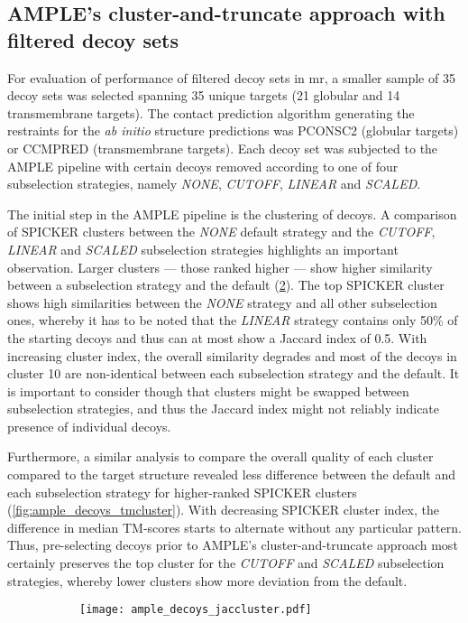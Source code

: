 \subsection{AMPLE's cluster-and-truncate approach with filtered decoy sets}
For evaluation of performance of filtered decoy sets in \gls{mr}, a smaller sample of 35 decoy sets was selected spanning 35 unique targets (21 globular and 14 transmembrane targets). The contact prediction algorithm generating the restraints for the \textit{ab initio} structure predictions was PCONSC2 (globular targets) or CCMPRED (transmembrane targets). Each decoy set was subjected to the AMPLE pipeline with certain decoys removed according to one of four subselection strategies, namely \textit{NONE}, \textit{CUTOFF}, \textit{LINEAR} and \textit{SCALED}.

The initial step in the AMPLE pipeline is the clustering of decoys. A comparison of SPICKER clusters between the \textit{NONE} default strategy and the \textit{CUTOFF}, \textit{LINEAR} and \textit{SCALED} subselection strategies highlights an important observation. Larger clusters --- those ranked higher --- show higher similarity between a subselection strategy and the default (\cref{fig:ample_decoys_jaccluster}). The top SPICKER cluster shows high similarities between the \textit{NONE} strategy and all other subselection ones, whereby it has to be noted that the \textit{LINEAR} strategy contains only 50\% of the starting decoys and thus can at most show a Jaccard index of 0.5. With increasing cluster index, the overall similarity degrades and most of the decoys in cluster 10 are non-identical between each subselection strategy and the default. It is important to consider though that clusters might be swapped between subselection strategies, and thus the Jaccard index might not reliably indicate presence of individual decoys.

Furthermore, a similar analysis to compare the overall quality of each cluster compared to the target structure revealed less difference between the default and each subselection strategy for higher-ranked SPICKER clusters (\cref{fig:ample_decoys_tmcluster}). With decreasing SPICKER cluster index, the difference in median TM-scores starts to alternate without any particular pattern. Thus, pre-selecting decoys prior to AMPLE's cluster-and-truncate approach most certainly preserves the top cluster for the \textit{CUTOFF} and \textit{SCALED} subselection strategies, whereby lower clusters show more deviation from the default.

\begin{figure}[H]
    \centering
    \begin{subfigure}[b]{\textwidth}
        \texttt{[image: ample\_decoys\_jaccluster.pdf]}
        \caption{}
        \label{fig:ample_decoys_jaccluster}
    \end{subfigure}
\end{figure}

